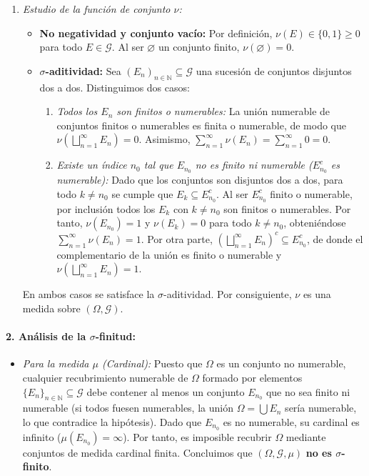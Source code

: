 \begin{problema}
\begin{enumerate}[label=\alph*)]
    \item \textit{Estudio de la función de conjunto $\nu$:}
    \begin{itemize}
        \item \textbf{No negatividad y conjunto vacío:} Por definición, $\nu(E) \in \{0, 1\} \ge 0$ para todo $E \in \mathcal{G}$. Al ser $\varnothing$ un conjunto finito, $\nu(\varnothing) = 0$.
        \item \textbf{$\sigma$-aditividad:} Sea $(E_n)_{n \in \mathbb{N}} \subseteq \mathcal{G}$ una sucesión de conjuntos disjuntos dos a dos. Distinguimos dos casos:
        \begin{enumerate}[label=\arabic*.]
            \item \textit{Todos los $E_n$ son finitos o numerables:} La unión numerable de conjuntos finitos o numerables es finita o numerable, de modo que $\nu\left(\bigsqcup_{n=1}^\infty E_n\right) = 0$. Asimismo, $\sum_{n=1}^\infty \nu(E_n) = \sum_{n=1}^\infty 0 = 0$.
            \item \textit{Existe un índice $n_0$ tal que $E_{n_0}$ no es finito ni numerable ($E_{n_0}^c$ es numerable):} Dado que los conjuntos son disjuntos dos a dos, para todo $k \neq n_0$ se cumple que $E_k \subseteq E_{n_0}^c$. Al ser $E_{n_0}^c$ finito o numerable, por inclusión todos los $E_k$ con $k \neq n_0$ son finitos o numerables. Por tanto, $\nu(E_{n_0}) = 1$ y $\nu(E_k) = 0$ para todo $k \neq n_0$, obteniéndose $\sum_{n=1}^\infty \nu(E_n) = 1$. Por otra parte, $\left(\bigsqcup_{n=1}^\infty E_n\right)^c \subseteq E_{n_0}^c$, de donde el complementario de la unión es finito o numerable y $\nu\left(\bigsqcup_{n=1}^\infty E_n\right) = 1$.
        \end{enumerate}
    \end{itemize}
    En ambos casos se satisface la $\sigma$-aditividad. Por consiguiente, $\nu$ es una medida sobre $(\Omega, \mathcal{G})$.
\end{enumerate}

\paragraph{2. Análisis de la $\sigma$-finitud:}
\begin{itemize}
    \item \textit{Para la medida $\mu$ (Cardinal):}
    Puesto que $\Omega$ es un conjunto no numerable, cualquier recubrimiento numerable de $\Omega$ formado por elementos $\{E_n\}_{n \in \mathbb{N}} \subseteq \mathcal{G}$ debe contener al menos un conjunto $E_{n_0}$ que no sea finito ni numerable (si todos fuesen numerables, la unión $\Omega = \bigcup E_n$ sería numerable, lo que contradice la hipótesis). Dado que $E_{n_0}$ es no numerable, su cardinal es infinito ($\mu(E_{n_0}) = \infty$). Por tanto, es imposible recubrir $\Omega$ mediante conjuntos de medida cardinal finita. Concluimos que $(\Omega, \mathcal{G}, \mu)$ \textbf{no es $\sigma$-finito}.


\end{itemize}
\end{problema}
